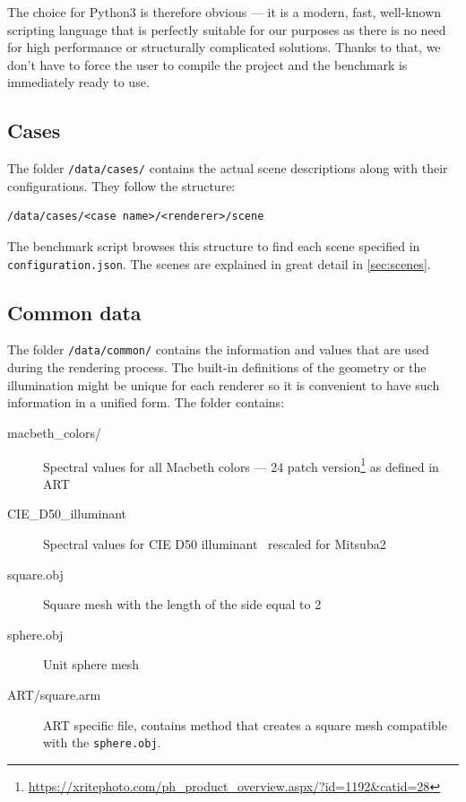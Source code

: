 The choice for Python3 is therefore obvious --- it is a modern, fast, well-known scripting language that is perfectly suitable for our purposes as there is no need for high performance or structurally complicated solutions. Thanks to that, we don't have to force the user to compile the project and the benchmark is immediately ready to use.

\subsection{Cases}

The folder \texttt{/data/cases/} contains the actual scene descriptions along with their configurations. They follow the structure:

\begin{lstlisting}
/data/cases/<case name>/<renderer>/scene
\end{lstlisting}

The benchmark script browses this structure to find each scene specified in \texttt{configuration.json}. The scenes are explained in great detail in \autoref{sec:scenes}.

\subsection{Common data}

The folder \texttt{/data/common/} contains the information and values that are used during the rendering process. The built-in definitions of the geometry or the illumination might be unique for each renderer so it is convenient to have such information in a unified form. The folder contains:

\begin{description}
	\item[macbeth\_colors/] Spectral values for all Macbeth colors --- 24 patch version\footnote{\url{https://xritephoto.com/ph_product_overview.aspx/?id=1192&catid=28}} as defined in ART
	\item[CIE\_D50\_illuminant] Spectral values for CIE D50 illuminant~\cite{cieData} rescaled for Mitsuba2
	\item[square.obj] Square mesh with the length of the side equal to 2
	\item[sphere.obj] Unit sphere mesh
	\item[ART/square.arm] ART specific file, contains method that creates a square mesh compatible with the \texttt{sphere.obj}.
\end{description}


